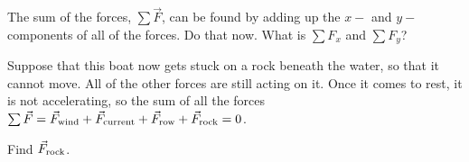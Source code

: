 \documentclass[12pt]{article}
\begin{document}
     \vspace{2in}
     
     The sum of the forces, $\sum \vec F$, can be found by adding up the $x-$ and $y-$components of all of the forces. Do that now. What is $\sum F_x$ and $\sum F_y$?
     
     \vspace{2in}
     
     Suppose that this boat now gets stuck on a rock beneath the water, so that it cannot move. All of the other forces are still acting on it. Once it comes to rest, it is not accelerating, so the sum of all the forces $\sum \vec F = \vec F_{\rm wind} +\vec F_{\rm current} +\vec F_{\rm row} +\vec F_{\rm rock} = 0$.
     
     Find $\vec F_{\rm rock}$.
 
\end{document}
